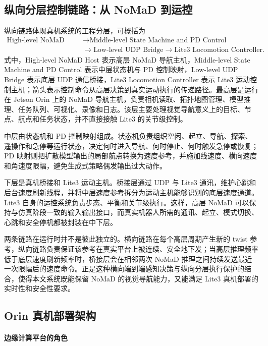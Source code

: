 \subsection{纵向分层控制链路：从 NoMaD 到运控}

纵向链路体现真机系统的工程分层，可概括为
\begin{equation}
\begin{aligned}
\text{High-level NoMaD Host}
&\rightarrow \text{Middle-level State Machine and PD Control} \\
&\rightarrow \text{Low-level UDP Bridge}
\rightarrow \text{Lite3 Locomotion Controller}.
\end{aligned}
\end{equation}
式中，High-level NoMaD Host 表示高层 NoMaD 导航主机，Middle-level State Machine and PD Control 表示中层状态机与 PD 控制映射，Low-level UDP Bridge 表示底层 UDP 通信桥接，Lite3 Locomotion Controller 表示 Lite3 运动控制主机；箭头表示控制命令从高层决策到真实运动执行的传递路径。最高层是运行在 Jetson Orin 上的 NoMaD 导航主机，负责相机读取、拓扑地图管理、模型推理、任务队列、可视化、录像和日志。该层主要处理视觉导航意义上的目标、节点、航点和任务状态，并不直接接触 Lite3 的关节级控制。

中层由状态机和 PD 控制映射组成。状态机负责组织空闲、起立、导航、探索、遥操作和急停等运行状态，决定何时进入导航、何时停止、何时触发急停或恢复；PD 映射则把扩散模型输出的局部航点转换为速度参考，并施加线速度、横向速度和角速度限幅，避免生成式策略偶发输出过大动作。

下层是真机桥接和 Lite3 运动主机。桥接层通过 UDP 与 Lite3 通讯，维护心跳和后台速度刷新线程，并将中层速度参考拆分为运动主机能够识别的底层速度通道。Lite3 自身的运控系统负责步态、平衡和关节级执行。这样，高层 NoMaD 可以保持与仿真阶段一致的输入输出接口，而真实机器人所需的通讯、起立、模式切换、心跳和安全停机都被封装在中下层。

两条链路在运行时并不是彼此独立的。横向链路在每个高层周期产生新的 twist 参考，纵向链路负责保证该参考在真实平台上被连续、安全地下发；当高层推理频率低于底层速度刷新频率时，桥接层会在相邻两次 NoMaD 推理之间持续发送最近一次限幅后的速度命令。正是这种横向端到端感知决策与纵向分层执行保护的结合，使得本文系统既能保留 NoMaD 的视觉导航能力，又能满足 Lite3 真机部署的实时性和安全性要求。

\subsection{Orin 真机部署架构}

\paragraph*{边缘计算平台的角色}

